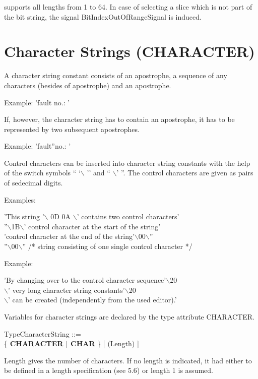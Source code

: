 \begin{added}
\OpenPEARL{} supports all lengths from 1 to 64.
In case of selecting a slice which is not part of the bit string, the
signal BitIndexOutOfRangeSignal is induced.
\end{added}

\section{Character Strings (CHARACTER)}  %

A character string constant consists of an apostrophe, a sequence of any
characters (besides of apostrophe) and an apostrophe.

Example: 'fault no.: '

If, however, the character string has to contain an apostrophe, it has
to be represented by two subsequent apostrophes.

Example: 'fault''no.: '

Control characters can be inserted into character string constants with
the help of the switch symbols `` `$\backslash$ '' and `` $\backslash$'
''.  The control characters are given as pairs of sedecimal digits.

Examples:

'This string '$\backslash$ 0D 0A $\backslash$' contains two control characters'\\
''$\backslash$1B$\backslash$' control character at the start of the string'\\
'control character at the end of the string'$\backslash$00$\backslash$''\\
''$\backslash$00$\backslash$'' /* string consisting of one single control character */

Example:

'By changing over to the control character sequence'$\backslash$20\\
$\backslash$' very long character string constants'$\backslash$20\\
$\backslash$' can be created (independently from the used editor).'

Variables for character strings are declared by the type attribute
CHARACTER.

TypeCharacterString ::=\\
\x \{ {\bf CHARACTER $\mid$ CHAR} \} [ (Length) ]

Length gives the number of characters. If no length is indicated, it had
either to be defined in a length specification (see 5.6) or length 1 is
assumed.

